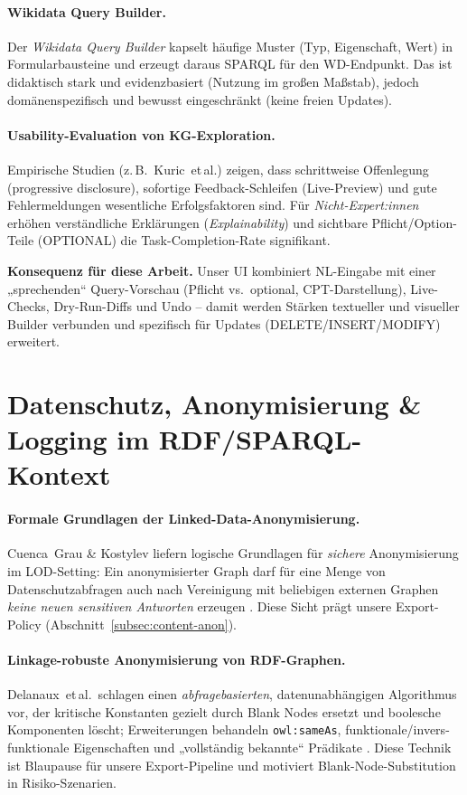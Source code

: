 \paragraph{Wikidata Query Builder.}
Der \emph{Wikidata Query Builder} kapselt häufige Muster (Typ, Eigenschaft, Wert) in Formularbausteine und erzeugt daraus SPARQL für den WD-Endpunkt. Das ist didaktisch stark und evidenzbasiert (Nutzung im großen Maßstab), jedoch domänenspezifisch und bewusst eingeschränkt (keine freien Updates).

\paragraph{Usability-Evaluation von KG-Exploration.}
Empirische Studien (z.\,B.\ Kuric~et\,al.) zeigen, dass schrittweise Offenlegung (progressive disclosure), sofortige Feedback-Schleifen (Live-Preview) und gute Fehlermeldungen wesentliche Erfolgsfaktoren sind. Für \emph{Nicht-Expert:innen} erhöhen verständliche Erklärungen (\emph{Explainability}) und sichtbare Pflicht/Option-Teile (OPTIONAL) die Task-Completion-Rate signifikant.

\medskip
\noindent\textbf{Konsequenz für diese Arbeit.} Unser UI kombiniert NL-Eingabe mit einer „sprechenden“ Query-Vorschau (Pflicht vs.\ optional, CPT-Darstellung), Live-Checks, Dry-Run-Diffs und Undo -- damit werden Stärken textueller und visueller Builder verbunden und spezifisch für Updates (DELETE/INSERT/MODIFY) erweitert.

\section{Datenschutz, Anonymisierung \& Logging im RDF/SPARQL-Kontext}
\label{sec:rw-privacy}

\paragraph{Formale Grundlagen der Linked-Data-Anonymisierung.}
Cuenca~Grau \& Kostylev liefern logische Grundlagen für \emph{sichere} Anonymisierung im LOD-Setting: Ein anonymisierter Graph darf für eine Menge von Datenschutzabfragen auch nach Vereinigung mit beliebigen externen Graphen \emph{keine neuen sensitiven Antworten} erzeugen \cite{cuenca_kostylev_logical_foundations_ppdp_ld}. Diese Sicht prägt unsere Export-Policy (Abschnitt~\ref{subsec:content-anon}).

\paragraph{Linkage-robuste Anonymisierung von RDF-Graphen.}
Delanaux~et\,al.\ schlagen einen \emph{abfragebasierten}, datenunabhängigen Algorithmus vor, der kritische Konstanten gezielt durch Blank Nodes ersetzt und boolesche Komponenten löscht; Erweiterungen behandeln \texttt{owl:sameAs}, funktionale/invers-funktionale Eigenschaften und „vollständig bekannte“ Prädikate \cite{delanaux_rdf_graph_anonymization_linkage}. Diese Technik ist Blaupause für unsere Export-Pipeline und motiviert Blank-Node-Substitution in Risiko-Szenarien.

